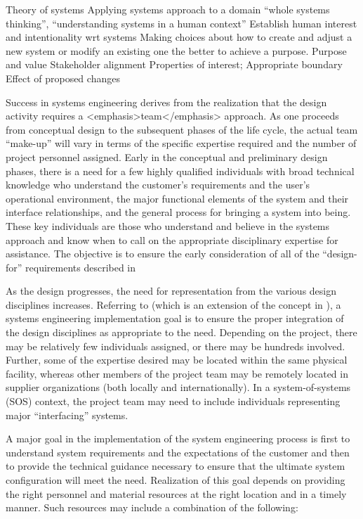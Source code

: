 Theory of systems
Applying systems approach to a domain
“whole systems thinking”, “understanding systems in a human context”
Establish human interest and intentionality wrt systems
Making choices about how to create and adjust a new system or modify an existing one the better to achieve a purpose.
Purpose and value
Stakeholder alignment
Properties of interest;
Appropriate boundary
Effect of proposed changes

Success in systems engineering derives from the realization that the design activity requires a <emphasis>team</emphasis> approach. As one proceeds from conceptual design to the subsequent phases of the life cycle, the actual team ``make-up'' will vary in terms of the specific expertise required and the number of project personnel assigned. Early in the conceptual and preliminary design phases, there is a need for a few highly qualified individuals with broad technical knowledge who understand the customer’s requirements and the user’s operational environment, the major functional elements of the system and their interface relationships, and the general process for bringing a system into being. These key individuals are those who understand and believe in the systems approach and know when to call on the appropriate disciplinary expertise for assistance. The objective is to ensure the early consideration of all of the ``design-for'' requirements described in 

As the design progresses, the need for representation from the various design disciplines increases. Referring to (which is an extension of the concept in ), a systems engineering implementation goal is to ensure the proper integration of the design disciplines as appropriate to the need. Depending on the project, there may be relatively few individuals assigned, or there may be hundreds involved. Further, some of the expertise desired may be located within the same physical facility, whereas other members of the project team may be remotely located in supplier organizations (both locally and internationally). In a system-of-systems (SOS) context, the project team may need to include individuals representing major “interfacing” systems.

A major goal in the implementation of the system engineering process is first to understand system requirements and the expectations of the customer and then to provide the technical guidance necessary to ensure that the ultimate system configuration will meet the need. Realization of this goal depends on providing the right personnel and material resources at the right location and in a timely manner. Such resources may include a combination of the following:	

